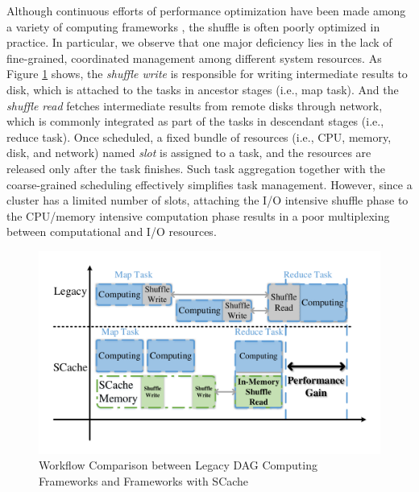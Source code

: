 Although continuous efforts of performance optimization have been made among a variety of computing frameworks \cite{sync, babu, tachyon, pacman, quincy, delay, ibrahim2012maestro, sharma2012mrorchestrator}, 
the shuffle is often poorly optimized in practice.
In particular, we observe that one major deficiency lies in the lack of fine-grained, coordinated management among different system resources.
As Figure \ref{fig:workflow} shows, the \textit{shuffle write} is responsible for writing intermediate results to disk, which is attached to the tasks in ancestor stages (i.e., map task).  
And the \textit{shuffle read} fetches intermediate results from remote disks through network, which is commonly integrated as part of the tasks in descendant stages (i.e., reduce task). 
Once scheduled, a fixed bundle of resources (i.e., CPU, memory, disk, and network) named \textit{slot} is assigned to a task, and the resources are released only after the task finishes.
Such task aggregation together with the coarse-grained scheduling effectively simplifies task management.
However, since a cluster has a limited number of slots, attaching the I/O intensive shuffle phase to the CPU/memory intensive computation phase results in a poor multiplexing between computational and I/O resources.
\begin{figure}
	\centering
	\includegraphics[width=\linewidth]{fig/workflow}
	\caption{Workflow Comparison between Legacy DAG Computing Frameworks and Frameworks with SCache}
	\label{fig:workflow}
\end{figure}

